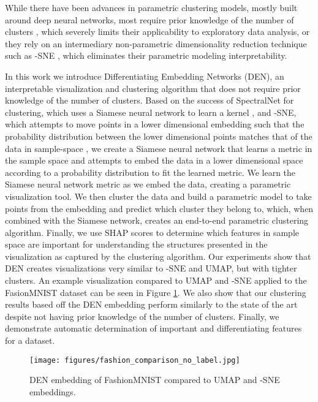 \documentclass{article}
\begin{document}
While there have been advances in parametric clustering models, mostly built around deep neural networks, most require prior knowledge of the number of clusters \cite{shaham2018spectralnet, mcconville2019n2d, mrabah2019deep, yang2016joint, mukherjee2019clustergan}, which severely limits their applicability to exploratory data analysis, or they rely on an intermediary non-parametric dimensionality reduction technique such as -SNE \cite{ren2020deep}, which eliminates their parametric modeling interpretability.

In this work we introduce Differentiating Embedding Networks (DEN), an interpretable visualization and clustering algorithm that does not require prior knowledge of the number of clusters. Based on the success of SpectralNet for clustering, which uses a Siamese neural network to learn a kernel \cite{shaham2018spectralnet}, and -SNE, which attempts to move points in a lower dimensional embedding such that the probability distribution between the lower dimensional points matches that of the data in sample-space \cite{maaten2008visualizing}, we create a Siamese neural network that learns a metric in the sample space and attempts to embed the data in a lower dimensional space according to a probability distribution to fit the learned metric. We learn the Siamese neural network metric as we embed the data, creating a parametric visualization tool. We then cluster the data and build a parametric model to take points from the embedding and predict which cluster they belong to, which, when combined with the Siamese network, creates an end-to-end parametric clustering algorithm. Finally, we use SHAP scores to determine which features in sample space are important \cite{NIPS2017_7062} for understanding the structures presented in the visualization as captured by the clustering algorithm. Our experiments show that DEN creates visualizations very similar to -SNE and UMAP, but with tighter clusters. An example visualization compared to UMAP and -SNE applied to the FasionMNIST dataset \cite{xiao2017fashion} can be seen in Figure \ref{fig:fashion_mnist_embedding}. We also show that our clustering results based off the DEN embedding perform similarly to the state of the art despite not having prior knowledge of the number of clusters. Finally, we demonstrate automatic determination of important and differentiating features for a dataset.

\begin{figure}[]
    \centering
    \texttt{[image: figures/fashion\_comparison\_no\_label.jpg]}
    \caption{DEN embedding of FashionMNIST compared to UMAP and -SNE embeddings.}
    \label{fig:fashion_mnist_embedding}
\end{figure}
\end{document}
